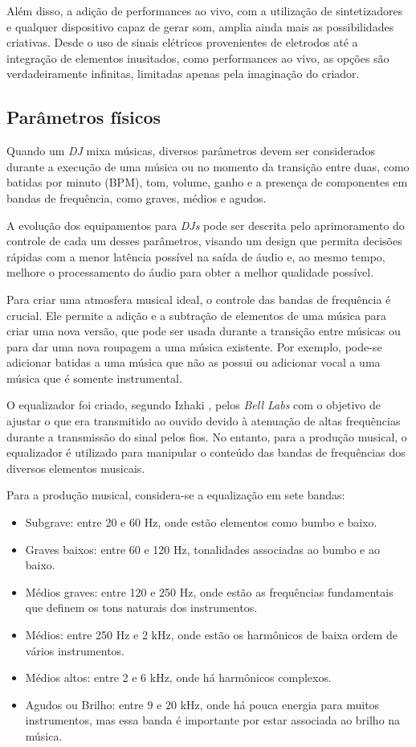 Além disso, a adição de performances ao vivo, com a utilização de sintetizadores e qualquer dispositivo capaz de gerar som, amplia ainda mais as possibilidades criativas. Desde o uso de sinais elétricos provenientes de eletrodos até a integração de elementos inusitados, como performances ao vivo, as opções são verdadeiramente infinitas, limitadas apenas pela imaginação do criador.

\subsection{Parâmetros físicos}

Quando um \textit{DJ} mixa músicas, diversos parâmetros devem ser considerados durante a execução de uma música ou no momento da transição entre duas, como batidas por minuto (BPM), tom, volume, ganho e a presença de componentes em bandas de frequência, como graves, médios e agudos.

A evolução dos equipamentos para \textit{DJs} pode ser descrita pelo aprimoramento do controle de cada um desses parâmetros, visando um design que permita decisões rápidas com a menor latência possível na saída de áudio e, ao mesmo tempo, melhore o processamento do áudio para obter a melhor qualidade possível.

Para criar uma atmosfera musical ideal, o controle das bandas de frequência é crucial. Ele permite a adição e a subtração de elementos de uma música para criar uma nova versão, que pode ser usada durante a transição entre músicas ou para dar uma nova roupagem a uma música existente. Por exemplo, pode-se adicionar batidas a uma música que não as possui ou adicionar vocal a uma música que é somente instrumental.

O equalizador foi criado, segundo Izhaki \cite{mixing}, pelos \textit{Bell Labs} com o objetivo de ajustar o que era transmitido ao ouvido devido à atenuação de altas frequências durante a transmissão do sinal pelos fios. No entanto, para a produção musical, o equalizador é utilizado para manipular o conteúdo das bandas de frequências dos diversos elementos musicais. 

Para a produção musical, considera-se a equalização em sete bandas:

\begin{itemize}
	\item Subgrave: entre 20 e 60 Hz, onde estão elementos como bumbo e baixo.
	\item Graves baixos: entre 60 e 120 Hz, tonalidades associadas ao bumbo e ao baixo.
	\item Médios graves: entre 120 e 250 Hz, onde estão as frequências fundamentais que definem os tons naturais dos instrumentos.
	\item Médios: entre 250 Hz e 2 kHz, onde estão os harmônicos de baixa ordem de vários instrumentos.
	\item Médios altos: entre 2 e 6 kHz, onde há harmônicos complexos.
	\item Agudos ou Brilho: entre 9 e 20 kHz, onde há pouca energia para muitos instrumentos, mas essa banda é importante por estar associada ao brilho na música.
\end{itemize}

